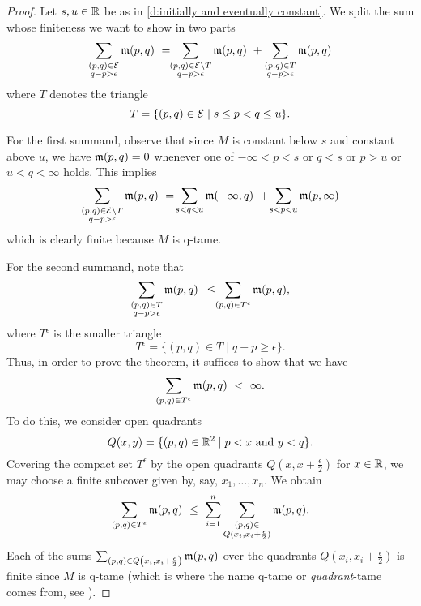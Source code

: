 \begin{proof}
	Let $s, u \in \mathbb{R}$ be as in \cref{d:initially and eventually constant}.
	We split the sum whose finiteness we want to show in two parts
	\begin{equation*}
	\sum_{ \substack{ (p,q) \in \mathcal{E} \\ q-p > \epsilon } } \mathfrak{m} (p,q) \ = \!\!
	\sum_{ \substack{ (p,q) \in \mathcal{E} \setminus T \\ q-p > \epsilon } } \mathfrak{m} (p,q) \ +
	\sum_{ \substack{ (p,q) \in T \\ q-p > \epsilon } } \mathfrak{m} (p,q)
	\end{equation*}
	where $T$ denotes the triangle
	\begin{equation*}
	T = \{(p,q) \in \mathcal{E} \mid s \leq p < q \leq u\}.
	\end{equation*}

	For the first summand, observe that since $M$ is constant below $s$ and constant above $u$, we have $\mathfrak{m}(p,q) = 0$ whenever one of $-\infty < p < s$ or $q < s$ or $p > u$ or $u < q < \infty$ holds.
	This implies
	\begin{equation*}
	\sum_{ \substack{ (p,q) \in \mathcal{E} \setminus T \\ q-p > \epsilon } } \mathfrak{m} (p,q)
	\ = \!
	\sum_{s < q < u} \mathfrak{m} (-\infty,q)
	\ + \!
	\sum_{s < p < u} \mathfrak{m} (p, \infty)
	\end{equation*}
	which is clearly finite because $M$ is q-tame.

	For the second summand, note that
	\begin{equation*}
	\sum_{ \substack{ (p,q) \in T \\ q-p > \epsilon } } \mathfrak{m} (p,q)
	\ \, \leq \!\!
	\sum_{(p,q) \in T^{\epsilon}} \mathfrak{m} (p,q),
	\end{equation*}
	where $T^{\epsilon}$ is the smaller triangle
	\begin{equation*}
	T^{\epsilon} = \{(p,q) \in T \mid q-p \geq \epsilon\}.
	\end{equation*}
	Thus, in order to prove the theorem, it suffices to show that we have
	\begin{equation*}
	\sum_{(p,q) \in T^{\epsilon}} \mathfrak{m} (p,q)
	\ < \
	\infty.
	\end{equation*}
	To do this, we consider open quadrants
	\begin{equation*}
	Q(x, y) = \{ (p, q) \in \mathbb{R}^2 \mid p < x \text{ and } y < q \}.
	\end{equation*}
	Covering the compact set $T^{\epsilon}$ by the open quadrants $Q \left(x, x + \frac{\epsilon}{2} \right)$ for $x \in \mathbb{R}$, we may choose a finite subcover given by, say, $x_1,\dots, x_n$.
	We obtain
	\begin{equation*}
	\sum_{(p,q) \in T^{\epsilon}} \mathfrak{m} (p,q)
	\ \leq \
	\sum_{i=1}^n \sum_{\substack{(p, q) \in \\ Q (x_i, x_i + \frac{\epsilon}{2})}} \mathfrak{m}(p,q).
	\end{equation*}
	Each of the sums $\sum_{(p,q) \in Q \left(x_i, x_i + \frac{\epsilon}{2} \right)} \mathfrak{m}(p,q)$ over the quadrants $Q \left(x_i, x_i + \frac{\epsilon}{2} \right)$ is finite since $M$ is q-tame (which is where the name q-tame or \emph{quadrant}-tame comes from, see \cite[Section 3.8]{Chazal.2016a}).
\end{proof}

